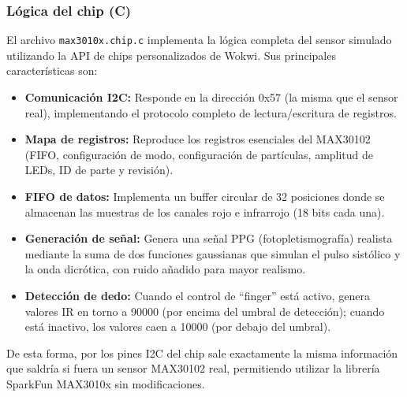 \documentclass[11pt,a4paper]{article}
\begin{document}
\subsubsection{Lógica del chip (C)}

El archivo \texttt{max3010x.chip.c} implementa la lógica completa del sensor simulado utilizando la API de chips personalizados de Wokwi. Sus principales características son:

\begin{itemize}
    \item \textbf{Comunicación I2C:} Responde en la dirección 0x57 (la misma que el sensor real), implementando el protocolo completo de lectura/escritura de registros.
    \item \textbf{Mapa de registros:} Reproduce los registros esenciales del MAX30102 (FIFO, configuración de modo, configuración de partículas, amplitud de LEDs, ID de parte y revisión).
    \item \textbf{FIFO de datos:} Implementa un buffer circular de 32 posiciones donde se almacenan las muestras de los canales rojo e infrarrojo (18 bits cada una).
    \item \textbf{Generación de señal:} Genera una señal PPG (fotopletismografía) realista mediante la suma de dos funciones gaussianas que simulan el pulso sistólico y la onda dicrótica, con ruido añadido para mayor realismo.
    \item \textbf{Detección de dedo:} Cuando el control de ``finger'' está activo, genera valores IR en torno a 90000 (por encima del umbral de detección); cuando está inactivo, los valores caen a 10000 (por debajo del umbral).
\end{itemize}

De esta forma, por los pines I2C del chip sale exactamente la misma información que saldría si fuera un sensor MAX30102 real, permitiendo utilizar la librería SparkFun MAX3010x sin modificaciones.
\end{document}

